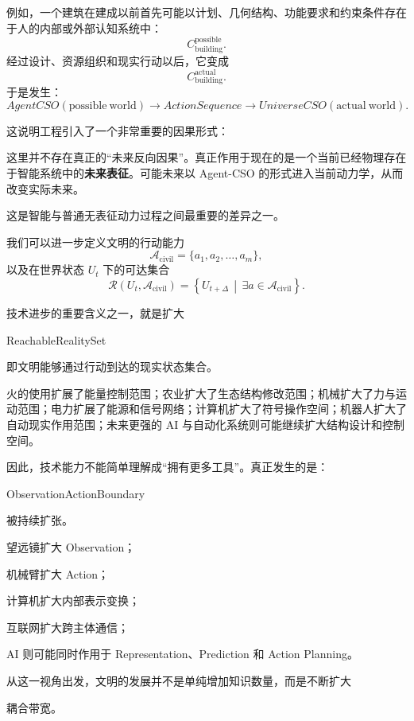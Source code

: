 例如，一个建筑在建成以前首先可能以计划、几何结构、功能要求和约束条件存在于人的内部或外部认知系统中：
\[
C_{\mathrm{building}}^{\mathrm{possible}}.
\]
经过设计、资源组织和现实行动以后，它变成
\[
C_{\mathrm{building}}^{\mathrm{actual}}.
\]
于是发生：
\[
AgentCSO(\mathrm{possible\ world})
\rightarrow
ActionSequence
\rightarrow
UniverseCSO(\mathrm{actual\ world}).
\]

这说明工程引入了一个非常重要的因果形式：
\begin{statementbox}
\centering
{}
\end{statementbox}

这里并不存在真正的“未来反向因果”。真正作用于现在的是一个当前已经物理存在于智能系统中的\textbf{未来表征}。可能未来以 Agent-CSO 的形式进入当前动力学，从而改变实际未来。

这是智能与普通无表征动力过程之间最重要的差异之一。

我们可以进一步定义文明的行动能力
\[
\mathcal{A}_{\mathrm{civil}}
=
\{a_1,a_2,\ldots,a_m\},
\]
以及在世界状态 $U_t$ 下的可达集合
\[
\mathcal{R}(U_t,\mathcal{A}_{\mathrm{civil}})
=
\left\{
U_{t+\Delta}
\,\middle|\,
\exists a\in\mathcal{A}_{\mathrm{civil}}
\right\}.
\]

技术进步的重要含义之一，就是扩大
\begin{statementbox}
ReachableRealitySet
\end{statementbox}
即文明能够通过行动到达的现实状态集合。

火的使用扩展了能量控制范围；农业扩大了生态结构修改范围；机械扩大了力与运动范围；电力扩展了能源和信号网络；计算机扩大了符号操作空间；机器人扩大了自动现实作用范围；未来更强的 AI 与自动化系统则可能继续扩大结构设计和控制空间。

因此，技术能力不能简单理解成“拥有更多工具”。真正发生的是：
\begin{statementbox}
ObservationActionBoundary
\end{statementbox}
被持续扩张。

望远镜扩大 Observation；

机械臂扩大 Action；

计算机扩大内部表示变换；

互联网扩大跨主体通信；

AI 则可能同时作用于 Representation、Prediction 和 Action Planning。

从这一视角出发，文明的发展并不是单纯增加知识数量，而是不断扩大
\begin{statementbox}
\centering
{}
\end{statementbox}
耦合带宽。

